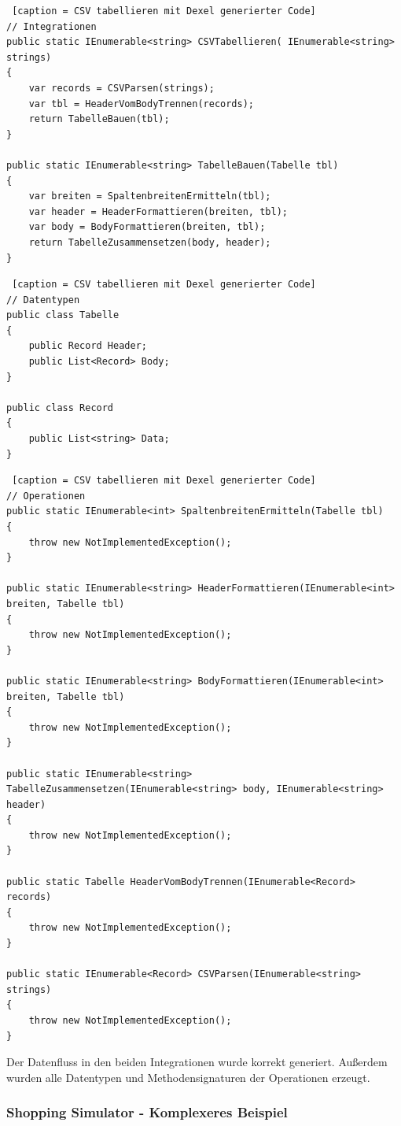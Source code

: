 \begin{lstlisting} [caption = CSV tabellieren mit Dexel generierter Code]
// Integrationen
public static IEnumerable<string> CSVTabellieren( IEnumerable<string> strings)
{
	var records = CSVParsen(strings);
	var tbl = HeaderVomBodyTrennen(records);
	return TabelleBauen(tbl);
}

public static IEnumerable<string> TabelleBauen(Tabelle tbl)
{
	var breiten = SpaltenbreitenErmitteln(tbl);
	var header = HeaderFormattieren(breiten, tbl);
	var body = BodyFormattieren(breiten, tbl);
	return TabelleZusammensetzen(body, header);
}
\end{lstlisting}

\begin{lstlisting} [caption = CSV tabellieren mit Dexel generierter Code]
// Datentypen
public class Tabelle
{
	public Record Header;
	public List<Record> Body;
}

public class Record
{
	public List<string> Data;
}
\end{lstlisting}

\begin{lstlisting} [caption = CSV tabellieren mit Dexel generierter Code]
// Operationen
public static IEnumerable<int> SpaltenbreitenErmitteln(Tabelle tbl)
{
    throw new NotImplementedException();
}

public static IEnumerable<string> HeaderFormattieren(IEnumerable<int> breiten, Tabelle tbl)
{
    throw new NotImplementedException();
}

public static IEnumerable<string> BodyFormattieren(IEnumerable<int> breiten, Tabelle tbl)
{
    throw new NotImplementedException();
}

public static IEnumerable<string> TabelleZusammensetzen(IEnumerable<string> body, IEnumerable<string> header)
{
    throw new NotImplementedException();
}

public static Tabelle HeaderVomBodyTrennen(IEnumerable<Record> records)
{
    throw new NotImplementedException();
}

public static IEnumerable<Record> CSVParsen(IEnumerable<string> strings)
{
    throw new NotImplementedException();
}
\end{lstlisting}

Der Datenfluss in den beiden Integrationen wurde korrekt generiert. 
Außerdem wurden alle Datentypen und Methodensignaturen der Operationen erzeugt.

\pagebreak

\subsubsection{Shopping Simulator - Komplexeres Beispiel}

